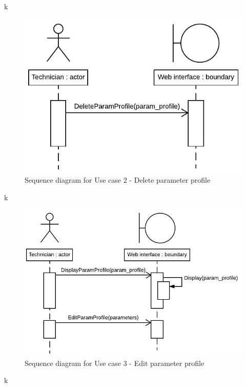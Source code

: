 k

\begin{figure}[H]
	\centering
	\includegraphics[width=1\linewidth]{Images/System_architecture/Use_case_2_SD}
	\caption{Sequence diagram for Use case 2 - Delete parameter profile}
\end{figure}

k

\begin{figure}[H]
	\centering
	\includegraphics[width=1\linewidth]{Images/System_architecture/Use_case_3_SD}
	\caption{Sequence diagram for Use case 3 - Edit parameter profile}
\end{figure}

k

